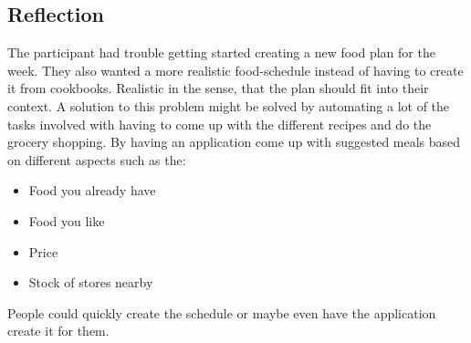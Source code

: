 \subsection{Reflection} 
The participant had trouble getting started creating a new food plan for the week. They also wanted a more realistic food-schedule instead of having to create it from cookbooks. Realistic in the sense, that the plan should fit into their context. A solution to this problem might be solved by automating a lot of the tasks involved with having to come up with the different recipes and do the grocery shopping.
By having an application come up with suggested meals based on different aspects such as the:
\begin{itemize}
\item Food you already have
\item Food you like
\item Price
\item Stock of stores nearby
\end{itemize}
People could quickly create the schedule or maybe even have the application create it for them.